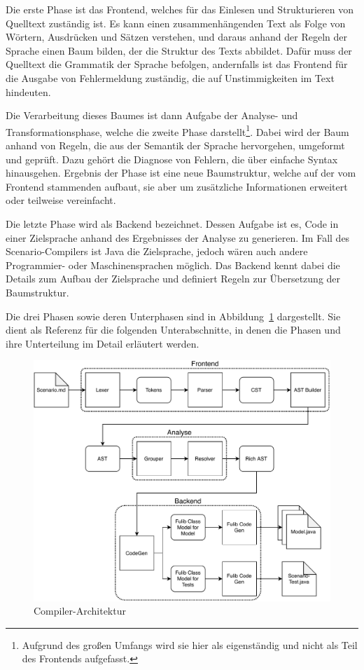Die erste Phase ist das Frontend, welches für das Einlesen und Strukturieren von Quelltext zuständig ist.
Es kann einen zusammenhängenden Text als Folge von Wörtern, Ausdrücken und Sätzen verstehen, und daraus anhand der Regeln der Sprache einen Baum bilden, der die Struktur des Texts abbildet.
Dafür muss der Quelltext die Grammatik der Sprache befolgen, andernfalls ist das Frontend für die Ausgabe von Fehlermeldung zuständig, die auf Unstimmigkeiten im Text hindeuten.

Die Verarbeitung dieses Baumes ist dann Aufgabe der Analyse- und Transformationsphase, welche die zweite Phase darstellt\footnote{Aufgrund des großen Umfangs wird sie hier als eigenständig und nicht als Teil des Frontends aufgefasst.}.
Dabei wird der Baum anhand von Regeln, die aus der Semantik der Sprache hervorgehen, umgeformt und geprüft.
Dazu gehört die Diagnose von Fehlern, die über einfache Syntax hinausgehen.
Ergebnis der Phase ist eine neue Baumstruktur, welche auf der vom Frontend stammenden aufbaut, sie aber um zusätzliche Informationen erweitert oder teilweise vereinfacht.

Die letzte Phase wird als Backend bezeichnet.
Dessen Aufgabe ist es, Code in einer Zielsprache anhand des Ergebnisses der Analyse zu generieren.
Im Fall des Scenario-Compilers ist Java die Zielsprache, jedoch wären auch andere Programmier- oder Maschinensprachen möglich.
Das Backend kennt dabei die Details zum Aufbau der Zielsprache  und definiert Regeln zur Übersetzung der Baumstruktur.

Die drei Phasen sowie deren Unterphasen sind in Abbildung~\ref{fig:compiler-architecture} dargestellt.
Sie dient als Referenz für die folgenden Unterabschnitte, in denen die Phasen und ihre Unterteilung im Detail erläutert werden.

\begin{figure}
    \includegraphics[width=\textwidth]{chapter/fulib-scenarios/img/architecture.pdf}
    \caption{Compiler-Architektur}
    \label{fig:compiler-architecture}
\end{figure}

